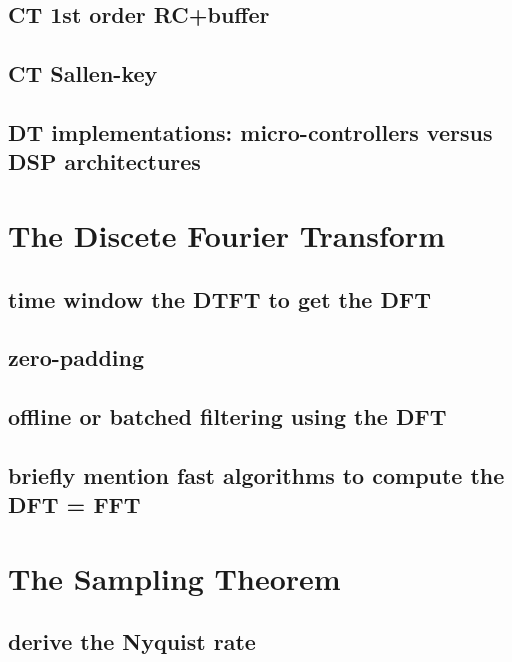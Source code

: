 \documentclass{article}
\begin{document}
\subsection{CT 1st order RC+buffer}
\label{sec:orgdaf03e4}

\subsection{CT Sallen-key}
\label{sec:orge746d43}

\subsection{DT implementations: micro-controllers versus DSP architectures}
\label{sec:org79ad593}

\newpage
\section{The Discete Fourier Transform}
\label{sec:org2209ae0}

\subsection{time window the DTFT to get the DFT}
\label{sec:org63dec5a}

\subsection{zero-padding}
\label{sec:org07d79db}

\subsection{offline or batched filtering using the DFT}
\label{sec:orge67491a}

\subsection{briefly mention fast algorithms to compute the DFT = FFT}
\label{sec:org00fe03f}

\newpage
\section{The Sampling Theorem}
\label{sec:org86060d9}

\subsection{derive the Nyquist rate}
\label{sec:org5c6408b}
\end{document}
